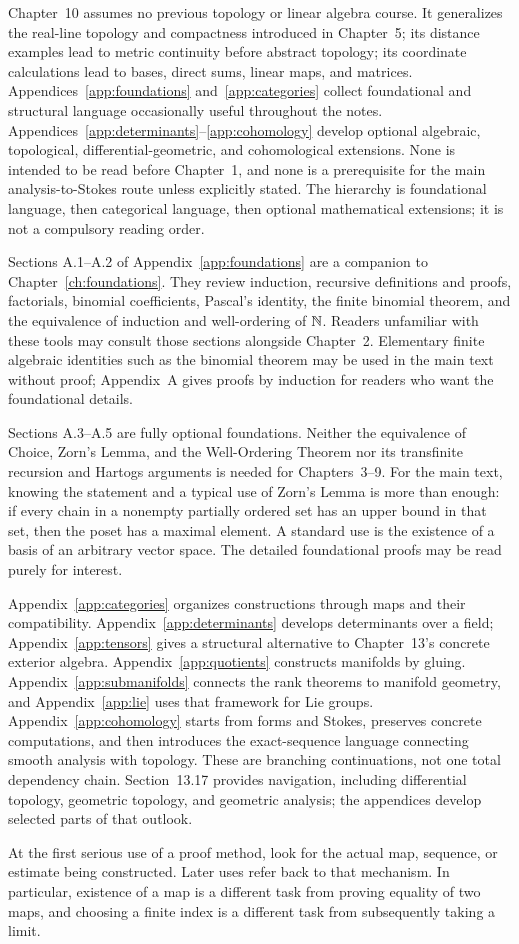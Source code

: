 Chapter~10 assumes no previous topology or linear algebra course. It
generalizes the real-line topology and compactness introduced in Chapter~5;
its distance examples lead to metric continuity before abstract
topology; its coordinate calculations lead to bases, direct sums, linear
maps, and matrices. Appendices~\ref{app:foundations} and~\ref{app:categories}
collect foundational and structural language occasionally useful throughout
the notes. Appendices~\ref{app:determinants}--\ref{app:cohomology} develop
optional algebraic, topological, differential-geometric, and cohomological
extensions. None is intended to be read before Chapter~1, and none is a
prerequisite for the main analysis-to-Stokes route unless explicitly stated.
The hierarchy is foundational language, then categorical language, then
optional mathematical extensions; it is not a compulsory reading order.

Sections A.1--A.2 of Appendix~\ref{app:foundations} are a companion to
Chapter~\ref{ch:foundations}. They review induction, recursive definitions
and proofs, factorials, binomial coefficients, Pascal's identity, the finite
binomial theorem, and the equivalence of induction and well-ordering of $\mathbb{N}$.
Readers unfamiliar with these tools may consult those sections alongside
Chapter~2. Elementary finite algebraic identities such as the binomial
theorem may be used in the main text without proof; Appendix~A gives proofs
by induction for readers who want the foundational details.

Sections A.3--A.5 are fully optional foundations. Neither the equivalence
of Choice, Zorn's Lemma, and the Well-Ordering Theorem nor its transfinite
recursion and Hartogs arguments is needed for Chapters~3--9. For the main
text, knowing the statement and a typical use of Zorn's Lemma is more than
enough: if every chain in a nonempty partially ordered set has an upper
bound in that set, then the poset has a maximal element. A standard use is
the existence of a basis of an arbitrary vector space. The detailed
foundational proofs may be read purely for interest.

Appendix~\ref{app:categories} organizes constructions through maps and their
compatibility. Appendix~\ref{app:determinants} develops determinants over a
field; Appendix~\ref{app:tensors} gives a structural alternative to
Chapter~13's concrete exterior algebra. Appendix~\ref{app:quotients}
constructs manifolds by gluing. Appendix~\ref{app:submanifolds} connects
the rank theorems to manifold geometry, and Appendix~\ref{app:lie} uses
that framework for Lie groups. Appendix~\ref{app:cohomology} starts from
forms and Stokes, preserves concrete computations, and then introduces
the exact-sequence language connecting smooth analysis with topology.
These are branching continuations, not one total dependency chain.
Section~13.17 provides navigation, including differential topology,
geometric topology, and geometric analysis; the appendices develop selected
parts of that outlook.

At the first serious use of a proof method, look for the actual map,
sequence, or estimate being constructed. Later uses refer back to that
mechanism. In particular, existence of a map is a different task from
proving equality of two maps, and choosing a finite index is a different
task from subsequently taking a limit.
